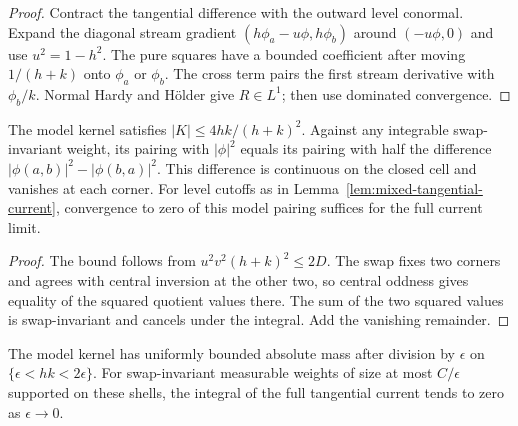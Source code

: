 \begin{proof}
\leanok
Contract the tangential difference with the outward level conormal.
Expand the diagonal stream gradient $(h\phi_a-u\phi,h\phi_b)$ around
$(-u\phi,0)$ and use $u^2=1-h^2$. The pure squares have a bounded
coefficient after moving $1/(h+k)$ onto $\phi_a$ or $\phi_b$.
The cross term pairs the first stream derivative with $\phi_b/k$.
Normal Hardy and Hölder give $R\in L^1$; then use dominated convergence.
\end{proof}

\begin{lemma}
\label{lem:mixed-tangential-model}
\leanok
The model kernel satisfies $|K|\le 4hk/(h+k)^2$. Against any integrable
swap-invariant weight, its pairing with $|\phi|^2$ equals its pairing with
half the difference $|\phi(a,b)|^2-|\phi(b,a)|^2$. This difference is
continuous on the closed cell and vanishes at each corner. For level cutoffs
as in Lemma~\ref{lem:mixed-tangential-current}, convergence to zero of this
model pairing suffices for the full current limit.
\end{lemma}

\begin{proof}
\leanok
The bound follows from $u^2v^2(h+k)^2\le 2D$. The swap fixes two corners
and agrees with central inversion at the other two, so central oddness
gives equality of the squared quotient values there. The sum of the
two squared values is swap-invariant and cancels under the integral.
Add the vanishing remainder.
\end{proof}

\begin{lemma}
\label{lem:mixed-tangential-shell}
\leanok
The model kernel has uniformly bounded absolute mass after division by
$\epsilon$ on $\{\epsilon<hk<2\epsilon\}$. For swap-invariant measurable
weights of size at most $C/\epsilon$ supported on these shells, the
integral of the full tangential current tends to zero as $\epsilon\to0$.
\end{lemma}

